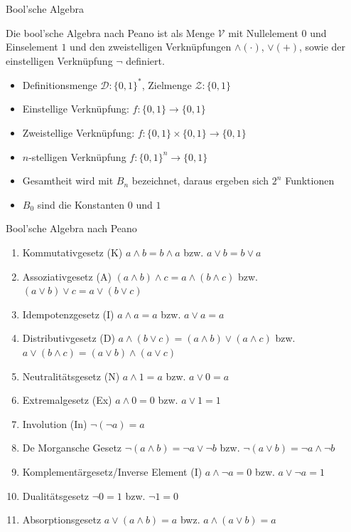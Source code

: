 \documentclass[12pt%
,aspectratio=169%
]{beamer}
\begin{document}
\begin{frame}{Bool'sche Algebra}
\begin{definition}
Die bool'sche Algebra nach Peano ist als Menge $\mathcal{V}$ mit Nullelement $0$ und Einselement $1$ und den zweistelligen Verknüpfungen $\land (\cdot)$, $\lor (+)$, sowie der einstelligen Verknüpfung $\neg$ definiert.
\end{definition}
\begin{itemize}
	\item Definitionsmenge $\mathcal{D}: \{0,1\}^*$, Zielmenge $\mathcal{Z}: \{0,1\}$
	\item Einstellige Verknüpfung: $f: \{0,1\} \to \{0,1\}$
	\item Zweistellige Verknüpfung: $f: \{0,1\} \times \{0,1\} \to \{0,1\}$
	\item $n$-stelligen Verknüpfung $f : \{0, 1\}^n \to \{0, 1\}$
	\item Gesamtheit wird mit $B_n$ bezeichnet, daraus ergeben sich $2^n$ Funktionen
	\item $B_0$ sind die Konstanten $0$ und $1$
\end{itemize}
\end{frame}


\begin{frame}{Bool'sche Algebra nach Peano}
\begin{enumerate}
	\item Kommutativgesetz (K) $a \land b = b \land a$ bzw. $a \lor b = b \lor a$
	\item Assoziativgesetz (A) $(a \land b ) \land c = a \land ( b \land c )$ bzw. $(a \lor b ) \lor c = a \lor ( b \lor c )$
	\item Idempotenzgesetz (I) $a \land a = a$ bzw. $a \lor a = a$
	\item Distributivgesetz (D) $a \land ( b \lor c ) = ( a \land b ) \lor ( a \land c )$ bzw. $a \lor ( b \land c ) = ( a \lor b ) \land ( a \lor c ) $
	\item Neutralitätsgesetz (N) $a \land 1 = a$ bzw. $a \lor 0 = a$
	\item Extremalgesetz (Ex) $a\land 0=0$ bzw. $ a\lor 1=1$
	\item Involution (In) $\neg(\neg a)=a $
	\item De Morgansche Gesetz $\neg(a \land b)=\neg a \lor \neg b$ bzw. $\neg(a\lor b)=\neg a\land\neg b$
	\item Komplementärgesetz/Inverse Element (I) $a\land\neg a=0$ bzw. $a\lor\neg a=1$
	\item Dualitätsgesetz 	$\neg 0 = 1$ bzw. $\neg 1 = 0$
	\item Absorptionsgesetz $a\lor(a\land b)=a$ bwz. $a\land (a\lor b)=a$
\end{enumerate}
\end{frame}
\end{document}
